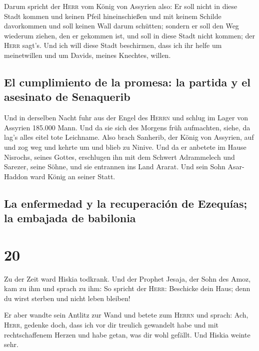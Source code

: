  Darum spricht der \textsc{Herr} vom König von Assyrien
also: Er soll nicht in diese Stadt kommen und keinen Pfeil
hineinschießen und mit keinem Schilde davorkommen und soll keinen Wall
darum schütten;  sondern er soll den Weg wiederum ziehen,
den er gekommen ist, und soll in diese Stadt nicht kommen; der
\textsc{Herr} sagt's.  Und ich will diese Stadt
beschirmen, dass ich ihr helfe um meinetwillen und um Davids, meines
Knechtes, willen.

\hypertarget{el-cumplimiento-de-la-promesa-la-partida-y-el-asesinato-de-senaquerib}{%
\subsection{El cumplimiento de la promesa: la partida y el asesinato de
Senaquerib}\label{el-cumplimiento-de-la-promesa-la-partida-y-el-asesinato-de-senaquerib}}

 Und in derselben Nacht fuhr aus der Engel des
\textsc{Herrn} und schlug im Lager von Assyrien 185.000 Mann. Und da sie
sich des Morgens früh aufmachten, siehe, da lag's alles eitel tote
Leichname.  Also brach Sanherib, der König von Assyrien,
auf und zog weg und kehrte um und blieb zu Ninive.  Und
da er anbetete im Hause Nisrochs, seines Gottes, erschlugen ihn mit dem
Schwert Adrammelech und Sarezer, seine Söhne, und sie entrannen ins Land
Ararat. Und sein Sohn Asar-Haddon ward König an seiner Statt.

\hypertarget{la-enfermedad-y-la-recuperaciuxf3n-de-ezequuxedas-la-embajada-de-babilonia}{%
\subsection{La enfermedad y la recuperación de Ezequías; la embajada de
babilonia}\label{la-enfermedad-y-la-recuperaciuxf3n-de-ezequuxedas-la-embajada-de-babilonia}}

\hypertarget{section-19}{%
\section{20}\label{section-19}}

 Zu der Zeit ward Hiskia todkrank. Und der Prophet Jesaja,
der Sohn des Amoz, kam zu ihm und sprach zu ihm: So spricht der
\textsc{Herr}: Beschicke dein Haus; denn du wirst sterben und nicht
leben bleiben!

 Er aber wandte sein Antlitz zur Wand und betete zum
\textsc{Herrn} und sprach:  Ach, \textsc{Herr}, gedenke
doch, dass ich vor dir treulich gewandelt habe und mit rechtschaffenem
Herzen und habe getan, was dir wohl gefällt. Und Hiskia weinte sehr.

